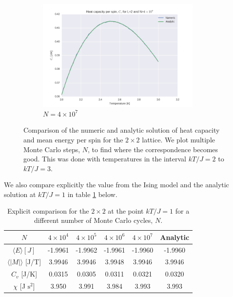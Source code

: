 \documentclass[a4paper, 10pt]{article}
\begin{document}
\begin{figure}[!ht]
\begin{subfigure}[H!]{0.5\textwidth}
        \includegraphics[height=2.2in]{L2Cv4e7.png}
        \caption{$N=4\times 10^7$}
    \end{subfigure}
    \caption{Comparison of the numeric and analytic solution of heat capacity and mean energy per spin for the $2\times 2$ lattice. We plot multiple Monte Carlo steps, $N$, to find where the correspondence becomes good. This was done with temperatures in the interval $kT/J=2$ to $kT/J=3$.}\label{fig:2x2_nsteps}
\end{figure}
We also compare explicitly the value from the Ising model and the analytic solution at $kT/J=1$ in table \ref{tab:2x2_compare} below.
\begin{table}
\centering
\caption{Explicit comparison for the $2 \times 2$ at the point $kT/J=1$ for a different number of Monte Carlo cycles, $N$.}\label{tab:2x2_compare}
\begin{tabular}{|c|ccccc|}
\hline
$N$ & $4 \times 10^4$ & $4\times 10^5$ & $4\times 10^6$ & $4 \times 10^7$ & Analytic\\ 
\hline
$ \langle E \rangle [J]$ &  -1.9961 & -1.9962 & -1.9961 & -1.9960 & -1.9960\\
$\langle |M|\rangle $ [J/T] &3.9946 &  3.9946 &3.9948 & 3.9946 & 3.9946\\
$C_v$ [J/K] &0.0315 & 0.0305 & 0.0311 & 0.0321 & 0.0320 \\
$\chi$ [J $\mathrm{s}^2$] &3.950 & 3.991 & 3.984 & 3.993 & 3.993 \\
\hline
\end{tabular}
\end{table}
\end{document}
